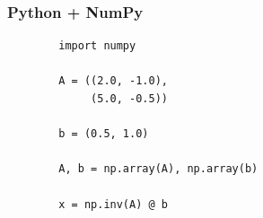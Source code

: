 \begin{frame}
    \frametitle{Python + NumPy}

    \begin{figure}
       \begin{center} %
       \end{center}
    \end{figure}

\end{frame}

\begin{frame}[fragile]

    \begin{verbatim}
        import numpy 

        A = ((2.0, -1.0),
             (5.0, -0.5))

        b = (0.5, 1.0)

        A, b = np.array(A), np.array(b)

        x = np.inv(A) @ b
    \end{verbatim}

\end{frame}

